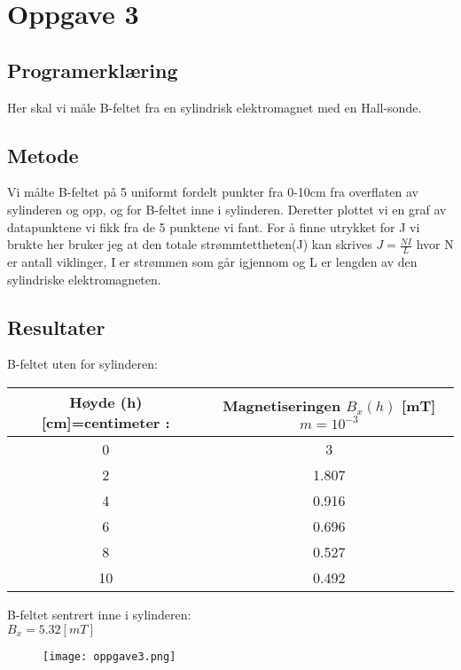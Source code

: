 \documentclass{article}
\begin{document}
\newpage
\section{Oppgave 3}
\subsection{Programerklæring}
Her skal vi måle B-feltet fra en sylindrisk elektromagnet med en Hall-sonde. 

\subsection{Metode}
Vi målte B-feltet på 5 uniformt fordelt punkter fra 0-10cm fra overflaten av sylinderen og opp, og for B-feltet inne i sylinderen. Deretter plottet vi en graf av datapunktene vi fikk fra de 5 punktene vi fant. 
For å finne utrykket for J vi brukte her bruker jeg at den totale strømmtettheten(J) kan skrives $J = \frac{NI}{L}$ hvor N er antall viklinger, I er strømmen som går igjennom og L er lengden av den sylindriske elektromagneten. 

\subsection{Resultater}
B-feltet uten for sylinderen:
\begin{center}
  \begin{tabular}{ | c | c |}
    \hline
    Høyde (h) [cm]=centimeter : & Magnetiseringen $B_x(h)$ [mT] $m=10^{-3}$\\ \hline
      0 & 3 \\ \hline
      2 & 1.807 \\ \hline
      4 & 0.916 \\ \hline
      6 & 0.696 \\ \hline
      8 & 0.527 \\ \hline
      10 & 0.492 \\
    \hline
  \end{tabular}
\end{center}
B-feltet sentrert inne i sylinderen:\\
$B_x = 5.32[mT]$

\begin{figure}[h!]
\texttt{[image: oppgave3.png]} 
\caption{}
\label{4}
\end{figure}
\end{document}
